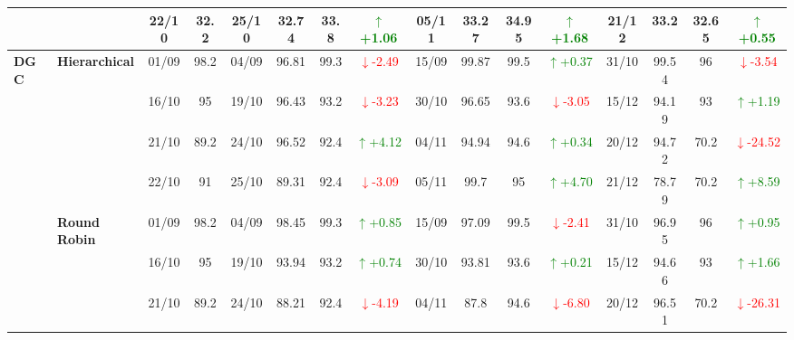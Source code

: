 \documentclass{ieeeaccess}
\begin{document}
{\begin{longtable}{llcc|cccc|cccc|cccc}
&
& 22/10 & 32.2 & 25/10 & 32.74 & 33.8 & \textcolor{green}{\(\uparrow\)+1.06} & 05/11 & 33.27 & 34.95 & \textcolor{green}{\(\uparrow\)+1.68} & 21/12 & 33.2 & 32.65 & \textcolor{green}{\(\uparrow\)+0.55} \\
\midrule




\multirow{12}{*}{\textbf{DGC}} 
& \textbf{Hierarchical}
& 01/09 & 98.2 & 04/09 & 96.81 & 99.3 & \textcolor{red}{\(\downarrow\)-2.49} & 15/09 & 99.87 & 99.5 & \textcolor{green}{\(\uparrow\)+0.37} & 31/10 & 99.54 & 96 & \textcolor{red}{\(\downarrow\)-3.54} \\

&
& 16/10 & 95 & 19/10 & 96.43 & 93.2 & \textcolor{red}{\(\downarrow\)-3.23} & 30/10 & 96.65 & 93.6 & \textcolor{red}{\(\downarrow\)-3.05} & 15/12 & 94.19 & 93 & \textcolor{green}{\(\uparrow\)+1.19} \\

&
& 21/10 & 89.2 & 24/10 & 96.52 & 92.4 & \textcolor{green}{\(\uparrow\)+4.12} & 04/11 & 94.94 & 94.6 & \textcolor{green}{\(\uparrow\)+0.34} & 20/12 & 94.72 & 70.2 & \textcolor{red}{\(\downarrow\)-24.52} \\

&
& 22/10 & 91 & 25/10 & 89.31 & 92.4 & \textcolor{red}{\(\downarrow\)-3.09} & 05/11 & 99.7 & 95 & \textcolor{green}{\(\uparrow\)+4.70} & 21/12 & 78.79 & 70.2 & \textcolor{green}{\(\uparrow\)+8.59} \\
\cmidrule(lr){2-16}


& \textbf{Round Robin}
& 01/09 & 98.2 & 04/09 & 98.45 & 99.3 & \textcolor{green}{\(\uparrow\)+0.85} & 15/09 & 97.09 & 99.5 & \textcolor{red}{\(\downarrow\)-2.41} & 31/10 & 96.95 & 96 & \textcolor{green}{\(\uparrow\)+0.95} \\

&
& 16/10 & 95 & 19/10 & 93.94 & 93.2 & \textcolor{green}{\(\uparrow\)+0.74} & 30/10 & 93.81 & 93.6 & \textcolor{green}{\(\uparrow\)+0.21} & 15/12 & 94.66 & 93 & \textcolor{green}{\(\uparrow\)+1.66} \\

&
& 21/10 & 89.2 & 24/10 & 88.21 & 92.4 & \textcolor{red}{\(\downarrow\)-4.19} & 04/11 & 87.8 & 94.6 & \textcolor{red}{\(\downarrow\)-6.80} & 20/12 & 96.51 & 70.2 & \textcolor{red}{\(\downarrow\)-26.31} \\


\end{longtable}}
\end{document}
